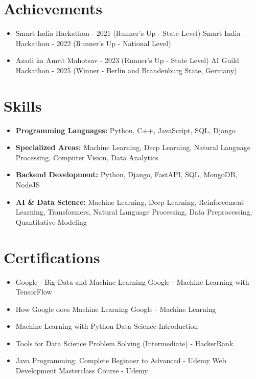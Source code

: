 \documentclass[a4paper,10pt]{article}
\begin{document}
\section*{Achievements}
\begin{itemize}
\item Smart India Hackathon - 2021 (Runner's Up - State Level) \hfill Smart India Hackathon - 2022 (Runner's Up - National Level)
\item Azadi ka Amrit Mahotsav - 2023 (Runner's Up - State Level) \hfill AI Guild Hackathon - 2025 (Winner - Berlin and Brandenburg State, Germany)
\end{itemize}

\section*{Skills}
\begin{itemize}
  \item \textbf{Programming Languages:} Python, C++, JavaScript, SQL, Django
  \item \textbf{Specialized Areas:} Machine Learning, Deep Learning, Natural Language Processing, Computer Vision, Data Analytics
  \item \textbf{Backend Development:} Python, Django, FastAPI, SQL, MongoDB, NodeJS
  \item \textbf{AI \& Data Science:} Machine Learning, Deep Learning, Reinforcement Learning, Transformers, Natural Language Processing, Data Preprocessing, Quantitative Modeling
\end{itemize}

\section*{Certifications}
\begin{itemize}
\item Google - Big Data and Machine Learning \hfill Google - Machine Learning with TensorFlow
\item How Google does Machine Learning \hfill Google - Machine Learning
\item Machine Learning with Python \hfill Data Science Introduction
\item Tools for Data Science \hfill Problem Solving (Intermediate) - HackerRank
\item Java Programming: Complete Beginner to Advanced - Udemy \hfill Web Development Masterclass Course - Udemy
\end{itemize}
\end{document}
